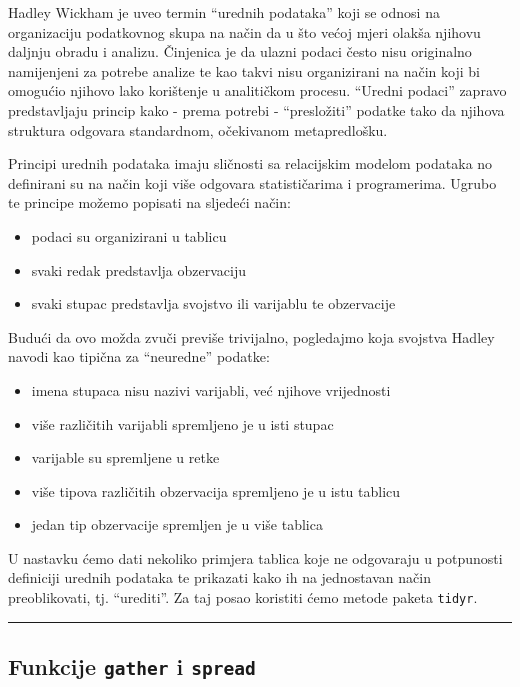 \documentclass[]{book}
\providecommand{\tightlist}{%
  \setlength{\itemsep}{0pt}\setlength{\parskip}{0pt}}
\theoremstyle{definition}
\theoremstyle{definition}
\theoremstyle{definition}
\theoremstyle{remark}
\begin{document}
Hadley Wickham je uveo termin ``urednih podataka'' koji se odnosi na
organizaciju podatkovnog skupa na način da u što većoj mjeri olakša
njihovu daljnju obradu i analizu. Činjenica je da ulazni podaci često
nisu originalno namijenjeni za potrebe analize te kao takvi nisu
organizirani na način koji bi omogućio njihovo lako korištenje u
analitičkom procesu. ``Uredni podaci'' zapravo predstavljaju princip
kako - prema potrebi - ``presložiti'' podatke tako da njihova struktura
odgovara standardnom, očekivanom metapredlošku.

Principi urednih podataka imaju sličnosti sa relacijskim modelom
podataka no definirani su na način koji više odgovara statističarima i
programerima. Ugrubo te principe možemo popisati na sljedeći način:

\begin{itemize}
\tightlist
\item
  podaci su organizirani u tablicu
\item
  svaki redak predstavlja obzervaciju
\item
  svaki stupac predstavlja svojstvo ili varijablu te obzervacije
\end{itemize}

Budući da ovo možda zvuči previše trivijalno, pogledajmo koja svojstva
Hadley navodi kao tipična za ``neuredne'' podatke:

\begin{itemize}
\tightlist
\item
  imena stupaca nisu nazivi varijabli, već njihove vrijednosti
\item
  više različitih varijabli spremljeno je u isti stupac
\item
  varijable su spremljene u retke
\item
  više tipova različitih obzervacija spremljeno je u istu tablicu
\item
  jedan tip obzervacije spremljen je u više tablica
\end{itemize}

U nastavku ćemo dati nekoliko primjera tablica koje ne odgovaraju u
potpunosti definiciji urednih podataka te prikazati kako ih na
jednostavan način preoblikovati, tj. ``urediti''. Za taj posao koristiti
ćemo metode paketa \texttt{tidyr}.

\begin{center}\rule{0.5\linewidth}{\linethickness}\end{center}

\subsection{\texorpdfstring{Funkcije \texttt{gather} i
\texttt{spread}}{Funkcije gather i spread}}\label{funkcije-gather-i-spread}
\end{document}
